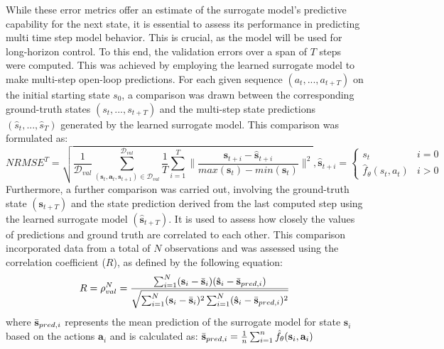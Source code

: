 While these error metrics offer an estimate of the surrogate model's predictive capability for the next state, it is essential to assess its performance in predicting multi time step model behavior. This is crucial, as the model will be used for long-horizon control. To this end, the validation errors over a span of $T$ steps were computed. This was achieved by employing the learned surrogate model to make multi-step open-loop predictions. For each given sequence $(a_t, ..., a_{t+T})$ on the initial starting state $s_0$, a comparison was drawn between the corresponding ground-truth states $(s_t, ..., s_{t+T})$ and the multi-step state predictions $(\hat{s}_t, ..., \hat{s}_T)$ generated by the learned surrogate model. This comparison was formulated as:
\begin{equation}
    NRMSE^{T} = \sqrt{\frac{1}{\mathcal{D}_{val}}\sum_{(\mathbf{s}_t,\mathbf{a}_t, \mathbf{s}_{t+1}) \in \mathcal{D}_{val}}^{\mathcal{D}_{val}}\frac{1}{T}\sum_{i=1}^{T}\lVert \frac{\mathbf{s}_{t+i}-\hat{\mathbf{s}}_{t+i}}{max(\mathbf{s}_t) - min(\mathbf{s}_t)}\rVert^2}, 
    \hat{\mathbf{s}}_{t+i} = \begin{cases} 
                        s_t & i=0 \\
                        \hat{f}_\theta(s_t, a_t) & i>0
                    \end{cases}
    \label{eq:NRMSET}
\end{equation}
Furthermore, a further comparison was carried out, involving the ground-truth state $(\mathbf{s}_{t+T})$ and the state prediction derived from the last computed step using the learned surrogate model $(\hat{\mathbf{s}}_{t+T})$. It is used to assess how closely the values of predictions and ground truth are correlated to each other. This comparison incorporated data from a total of $N$ observations and was assessed using the correlation coefficient ($R$), as defined by the following equation:
\begin{equation}
    R=\rho_{val}^{N} = \frac{\sum_{i=1}^{N}(\mathbf{s}_i - \Bar{\mathbf{s}}_i)(\hat{\mathbf{s}}_i-\Bar{\mathbf{s}}_{pred,i})}{\sqrt{\sum_{i=1}^{N}(\mathbf{s}_i - \Bar{\mathbf{s}}_i)^2 \sum_{i=1}^{N}(\hat{\mathbf{s}}_i-\Bar{\mathbf{s}}_{pred,i})^2}}
    \label{eq:R}
\end{equation}
where $\Bar{\mathbf{s}}_{pred,i}$ represents the mean prediction of the surrogate model for state $\mathbf{s}_i$ based on the actions $\mathbf{a}_i$ and is calculated as: $\Bar{\mathbf{s}}_{pred,i} = \frac{1}{n}\sum_{i=1}^{n}\hat{f}_\theta(\mathbf{s}_i, \mathbf{a}_i)$ 

